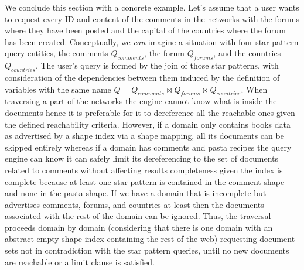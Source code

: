 We conclude this section with a concrete example.
Let's assume that a user wants to request every ID and content of the comments in the networks with the forums where they have been posted and the capital of the countries where the forum has been created.
Conceptually, we \emph{can} imagine a situation with four star pattern query entities, the comments $ Q_{comments}$, the forum $Q_{forums}$, and the countries $Q_{countries}$.
The user's query is formed by the join of those star patterns, with consideration of the dependencies between them induced by the definition of variables with the same name $Q = Q_{comments} \bowtie Q_{forums} \bowtie Q_{countries}$. 
When traversing a part of the networks the engine cannot know what is inside the documents hence it is preferable for it to dereference all the reachable ones given the defined reachability criteria.
However, if a domain only contains books data as advertised by a shape index via a shape mapping, all its documents can be skipped entirely 
whereas if a domain has comments and pasta recipes the query engine can know it can safely limit its dereferencing to the set of documents related to comments without affecting results completeness given the index is complete
because at least one star pattern is contained in the comment shape and none in the pasta shape.
If we have a domain that is incomplete but advertises comments, forums, and countries at least then the documents associated with the rest of the domain can be ignored.
Thus, the traversal proceeds domain by domain (considering that there is one domain with an abstract empty shape index containing the rest of the web) requesting document sets not in contradiction with the star pattern queries, until no new documents are reachable or a limit clause is satisfied.
